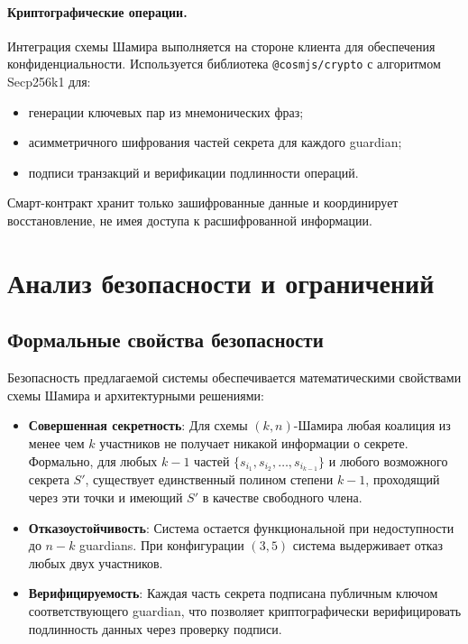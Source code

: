 \paragraph{Криптографические операции.}

Интеграция схемы Шамира выполняется на стороне клиента для обеспечения конфиденциальности. Используется библиотека \texttt{@cosmjs/crypto} с алгоритмом Secp256k1 для:
\begin{itemize}
\item
генерации ключевых пар из мнемонических фраз;
\item
асимметричного шифрования частей секрета для каждого guardian;
\item
подписи транзакций и верификации подлинности операций.
\end{itemize}

Смарт-контракт хранит только зашифрованные данные и координирует восстановление, не имея доступа к расшифрованной информации.

\section{Анализ безопасности и ограничений}

\subsection{Формальные свойства безопасности}

Безопасность предлагаемой системы обеспечивается математическими свойствами схемы Шамира и архитектурными решениями:

\begin{itemize}
\item
\textbf{Совершенная секретность}: Для схемы $(k,n)$-Шамира любая коалиция из менее чем $k$ участников не получает никакой информации о секрете. Формально, для любых $k-1$ частей $\{s_{i_1}, s_{i_2}, \ldots, s_{i_{k-1}}\}$ и любого возможного секрета $S'$, существует единственный полином степени $k-1$, проходящий через эти точки и имеющий $S'$ в качестве свободного члена.

\item
\textbf{Отказоустойчивость}: Система остается функциональной при недоступности до $n-k$ guardians. При конфигурации $(3,5)$ система выдерживает отказ любых двух участников.

\item
\textbf{Верифицируемость}: Каждая часть секрета подписана публичным ключом соответствующего guardian, что позволяет криптографически верифицировать подлинность данных через проверку подписи.
\end{itemize}

